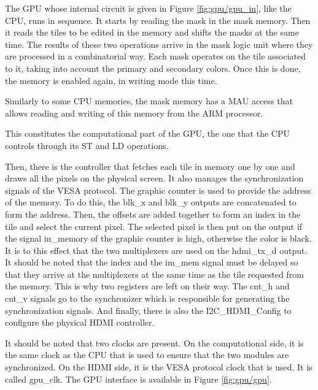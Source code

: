 The GPU whose internal circuit is given in Figure \ref{fig:gpu/gpu_in}, like the CPU, runs in 
sequence. It starts by reading the mask in the mask memory. Then it reads the tiles to be edited in 
the memory and shifts the masks at the same time. The results of these two operations arrive in the 
mask logic unit where they are processed in a combinatorial way. Each mask operates on the tile 
associated to it, taking into account the primary and secondary colors. Once this is done, the 
memory is enabled again, in writing mode this time. 

Similarly to some CPU memories, the mask memory has a MAU access that allows reading and writing of this 
memory from the ARM processor.

This constitutes the computational part of the GPU, the one that the CPU controls through its ST and 
LD operations. 

Then, there is the controller that fetches each tile in memory one by one and draws all the pixels
on the physical screen. 
It also manages the synchronization signals of the VESA protocol. The graphic counter is used to 
provide the address of the memory. To do this, the blk\_x and blk\_y outputs are concatenated to 
form the address. Then, the offsets are added together to form an index in the tile and select the current 
pixel. The selected pixel is then put on the output if the signal in\_memory of the graphic counter 
is high, otherwise the color is black. It is to this effect that the two multiplexers are used on 
the hdmi\_tx\_d output. It should be noted that the index and the im\_mem signal must be delayed so 
that they arrive at the multiplexers at the same time as the tile requested from the memory. This 
is why two registers are left on their way. The cnt\_h and cnt\_v signals go to the synchronizer 
which is responsible for generating the synchronization signals. And finally, there is also the 
I2C\_HDMI\_Config to configure the physical HDMI controller.

It should be noted that two clocks are present. On the computational side, it is the same clock as 
the CPU that is used to ensure that the two modules are synchronized. On the HDMI side, it is the 
VESA protocol clock that is used. It is called gpu\_clk. The GPU interface is available in Figure
\ref{fig:gpu/gpu}.

